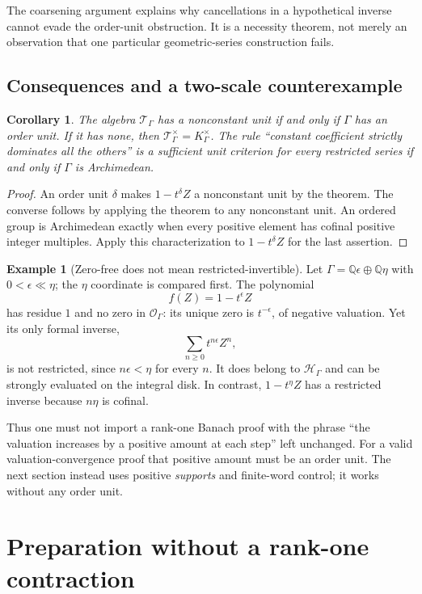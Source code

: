 \documentclass[11pt,letterpaper]{article}
\numberwithin{equation}{section}
\newtheorem{corollary}[theorem]{Corollary}
\theoremstyle{definition}
\newtheorem{example}[theorem]{Example}
\theoremstyle{remark}
\newcommand{\Q}{\mathbb Q}
\begin{document}
The coarsening argument explains why cancellations in a hypothetical inverse
cannot evade the order-unit obstruction. It is a necessity theorem, not merely
an observation that one particular geometric-series construction fails.

\subsection{Consequences and a two-scale counterexample}
\begin{corollary}\label{cor:unit-structure}
The algebra $\mathcal T_\Gamma$ has a nonconstant unit if and only if $\Gamma$
has an order unit. If it has none, then
$\mathcal T_\Gamma^\times=K_\Gamma^\times$.
The rule ``constant coefficient strictly dominates all the others'' is a
sufficient unit criterion for every restricted series if and only if $\Gamma$
is Archimedean.
\end{corollary}
\begin{proof}
An order unit $\delta$ makes $1-t^\delta Z$ a nonconstant unit by the theorem.
The converse follows by applying the theorem to any nonconstant unit.
An ordered group is Archimedean exactly when every positive element has
cofinal positive integer multiples. Apply this characterization to
$1-t^\delta Z$ for the last assertion.
\end{proof}

\begin{example}[Zero-free does not mean restricted-invertible]
\label{ex:ranktwo-unit}
Let $\Gamma=\Q\epsilon\oplus\Q\eta$ with
$0<\epsilon\ll\eta$; the $\eta$ coordinate is compared first. The polynomial
\[
 f(Z)=1-t^\epsilon Z
\]
has residue $1$ and no zero in $\mathcal O_\Gamma$: its unique zero is
$t^{-\epsilon}$, of negative valuation. Yet its only formal inverse,
\[
 \sum_{n\ge0}t^{n\epsilon}Z^n,
\]
is not restricted, since $n\epsilon<\eta$ for every $n$. It does belong to
$\mathcal H_\Gamma$ and can be strongly evaluated on the integral disk.
In contrast, $1-t^\eta Z$ has a restricted inverse because $n\eta$ is cofinal.
\end{example}

Thus one must not import a rank-one Banach proof with the phrase
``the valuation increases by a positive amount at each step'' left unchanged.
For a valid valuation-convergence proof that positive amount must be an
order unit. The next section instead uses positive \emph{supports} and
finite-word control; it works without any order unit.

\section{Preparation without a rank-one contraction}\label{sec:preparation}
\end{document}
